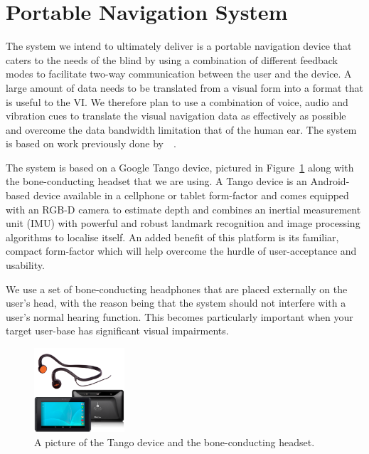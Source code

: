 \documentclass[format=sigconf, review=true, screen=true, anonymous=true]{acmart}
\begin{document}
\section{Portable Navigation System}
\label{sec:portable-navigation}

The system we intend to ultimately deliver is a portable navigation device that caters to the needs of the blind by using a combination of different feedback modes to facilitate two-way communication between the user and the device. A large amount of data needs to be translated from a visual form into a format that is useful to the VI. We therefore plan to use a combination of voice, audio and vibration cues to translate the visual navigation data as effectively as possible and overcome the data bandwidth limitation that of the human ear. The system is based on work previously done by~\citeauthor{bellotto2013}~\cite{bellotto2013}. 

The system is based on a Google Tango device, pictured in Figure~\ref{fig:tango} along with the bone-conducting headset that we are using. A Tango device is an Android-based device available in a cellphone or tablet form-factor and comes equipped with an RGB-D camera to estimate depth and combines an inertial measurement unit (IMU) with powerful and robust landmark recognition and image processing algorithms to localise itself. An added benefit of this platform is its familiar, compact form-factor which will help overcome the hurdle of user-acceptance and usability. %

We use a set of bone-conducting headphones that are placed externally on the user's head, with the reason being that the system should not interfere with a user's normal hearing function. This becomes particularly important when your target user-base has significant visual impairments. 

\begin{figure}
  \centering
  \includegraphics[width=0.3\textwidth]{figures/tango_headphone.png}
  \caption{A picture of the Tango device and the bone-conducting headset.}
  \label{fig:tango}
\end{figure}
\end{document}
